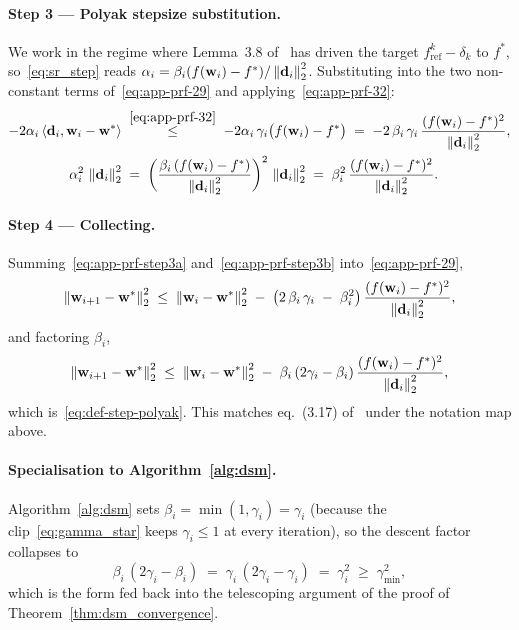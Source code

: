 \paragraph{Step 3 --- Polyak stepsize substitution.}
We work in the regime where Lemma~3.8 of~\cite{dantonio2009deflected} has driven the target $f^{k}_{\mathrm{ref}} - \delta_{k}$ to $f^*$, so~\eqref{eq:sr_step} reads $\alpha_i = \beta_i (f(\mathbf{w}_i) - f^*)/\left\lVert \mathbf{d}_i \right\rVert_{2}^{2}$. Substituting into the two non-constant terms of~\eqref{eq:app-prf-29} and applying~\eqref{eq:app-prf-32}:
\begin{align}
-2\alpha_i\,\langle \mathbf{d}_i, \mathbf{w}_i - \mathbf{w}^* \rangle
\;&\overset{\eqref{eq:app-prf-32}}{\le}\; -2\alpha_i\,\gamma_i\bigl(f(\mathbf{w}_i) - f^*\bigr)
\;=\; -2\,\beta_i\,\gamma_i\,\frac{(f(\mathbf{w}_i) - f^*)^{2}}{\left\lVert \mathbf{d}_i \right\rVert_{2}^{2}}, \label{eq:app-prf-step3a}\\
\alpha_i^{2}\,\left\lVert \mathbf{d}_i \right\rVert_{2}^{2}
\;&=\; \biggl(\frac{\beta_i\,(f(\mathbf{w}_i) - f^*)}{\left\lVert \mathbf{d}_i \right\rVert_{2}^{2}}\biggr)^{2}\,\left\lVert \mathbf{d}_i \right\rVert_{2}^{2}
\;=\; \beta_i^{2}\,\frac{(f(\mathbf{w}_i) - f^*)^{2}}{\left\lVert \mathbf{d}_i \right\rVert_{2}^{2}}. \label{eq:app-prf-step3b}
\end{align}

\paragraph{Step 4 --- Collecting.}
Summing~\eqref{eq:app-prf-step3a} and~\eqref{eq:app-prf-step3b} into~\eqref{eq:app-prf-29},
\[
\left\lVert \mathbf{w}_{i+1} - \mathbf{w}^* \right\rVert_{2}^{2}
\;\le\; \left\lVert \mathbf{w}_i - \mathbf{w}^* \right\rVert_{2}^{2}
\;-\; \bigl(2\,\beta_i\,\gamma_i \;-\; \beta_i^{2}\bigr)\,\frac{(f(\mathbf{w}_i) - f^*)^{2}}{\left\lVert \mathbf{d}_i \right\rVert_{2}^{2}},
\]
and factoring $\beta_i$,
\[
\left\lVert \mathbf{w}_{i+1} - \mathbf{w}^* \right\rVert_{2}^{2}
\;\le\; \left\lVert \mathbf{w}_i - \mathbf{w}^* \right\rVert_{2}^{2}
\;-\; \beta_i\,(2\gamma_i - \beta_i)\,\frac{(f(\mathbf{w}_i) - f^*)^{2}}{\left\lVert \mathbf{d}_i \right\rVert_{2}^{2}},
\]
which is~\eqref{eq:def-step-polyak}. This matches eq.~(3.17) of~\cite{dantonio2009deflected} under the notation map above.

\paragraph{Specialisation to Algorithm~\ref{alg:dsm}.}
Algorithm~\ref{alg:dsm} sets $\beta_i = \min(1, \gamma_i) = \gamma_i$ (because the clip~\eqref{eq:gamma_star} keeps $\gamma_i \le 1$ at every iteration), so the descent factor collapses to
\[
\beta_i\,(2\gamma_i - \beta_i) \;=\; \gamma_i\,(2\gamma_i - \gamma_i) \;=\; \gamma_i^{2} \;\ge\; \gamma_{\min}^{2},
\]
which is the form fed back into the telescoping argument of the proof of Theorem~\ref{thm:dsm_convergence}.

